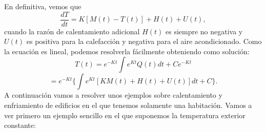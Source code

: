 En definitiva, vemos que 
\begin{equation}
	\dfrac{d T}{d t} = K[M(t) - T(t)] + H(t) + U(t),
\end{equation}
cuando la razón de calentamiento adicional $H(t)$ es siempre no negativa y $U(t)$ es positiva para la calefacción y negativa para el aire acondicionado. Como la ecuación es lineal, podemos resolverla fácilmente obteniendo como solución:
\begin{equation}\label{eq:apli2}
	T(t) = e^{-Kt}\int e^{Kt}Q(t)dt + Ce^{-Kt}
\end{equation}
\begin{equation}
	= e^{-Kt}\{\int e^{Kt}[KM(t) + H(t) + U(t)]dt + C\}.
\end{equation}
A continuación vamos a resolver unos ejemplos sobre calentamiento y enfriamiento de edificios en el que tenemos solamente una habitación. Vamos a ver primero un ejemplo sencillo en el que suponemos la temperatura exterior constante:
